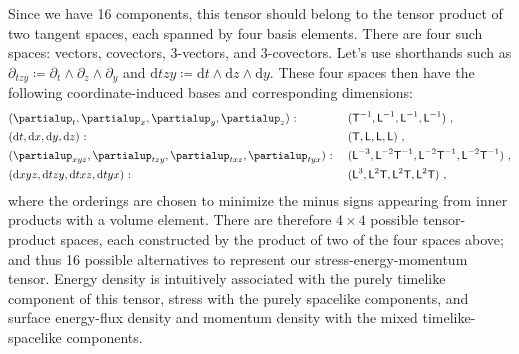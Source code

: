 \documentclass[\ifafour a4paper,12pt,\else a5paper,10pt,\fi%
onecolumn,oneside,article,%
british%
]{memoir}
\theoremstyle{remark}
\theoremstyle{innote}
\newcommand*{\de}{\partialup}%
\newcommand*{\di}{\mathrm{d}}%
\newcommand*{\defd}{\coloneqq}
\renewcommand*{\|}[1][]{\nonscript\,#1\vert\nonscript\;\mathopen{}}
\newcommand*{\Le}{\textsf{L}}
\newcommand*{\Ti}{\textsf{T}}
\begin{document}
Since we have 16 components, this tensor should belong to the tensor
product of two tangent spaces, each spanned by four basis elements. There
are four such spaces: vectors, covectors, 3-vectors, and 3-covectors. Let's
use shorthands such as
$\de_{tzy} \defd \de_{t} \land \de_{z} \land \de_{y}$ and
$\di tzy \defd \di t \land \di z \land \di y$. These four spaces then have
the following coordinate-induced bases and corresponding dimensions:
\begin{subequations}\label{eq:bases}
  \begin{align}
    \label{eq:base_vec}
    &  (\de_{t}, \de_{x}, \de_{y}, \de_{z})\ \text{:}
    &&\text{\small }\ (\Ti^{-1}, \Le^{-1}, \Le^{-1}, \Le^{-1}) \ ,
    \\
    \label{eq:base_covec}
    &  (\di t, \di x, \di y, \di z) \ \text{:}
    &&\text{\small }\ (\Ti, \Le, \Le, \Le) \ ,
    \\
    \label{eq:base_trivec}
    &  (\de_{xyz}, \de_{tzy}, \de_{txz}, \de_{tyx})\ \text{:}
    &&\text{\small }\  (\Le^{-3}, \Le^{-2}\Ti^{-1}, \Le^{-2}\Ti^{-1}, \Le^{-2}\Ti^{-1}) \ ,
    \\
    \label{eq:base_tricovec}
    &  (\di xyz, \di tzy, \di txz, \di tyx)\ \text{:}
    &&\text{\small }\  (\Le^{3}, \Le^{2}\Ti, \Le^{2}\Ti, \Le^{2}\Ti) \ ,
  \end{align}
\end{subequations}
where the orderings are chosen to minimize the minus signs appearing from
inner products with a volume element. There are therefore $4 \times 4$
possible tensor-product spaces, each constructed by the product of two of
the four spaces above; %
and thus 16 possible alternatives to represent our stress-energy-momentum
tensor. Energy density is intuitively associated with the purely timelike
component of this tensor, stress with the purely spacelike components, and
surface energy-flux density and momentum density with the mixed
timelike-spacelike components.
\end{document}
